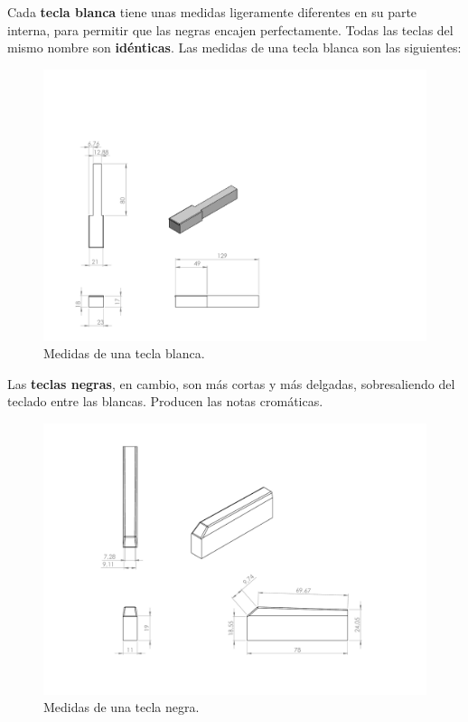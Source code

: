\newpage

Cada \textbf{tecla blanca} tiene unas medidas ligeramente diferentes en su parte interna, para permitir que las negras encajen perfectamente. Todas las teclas del mismo nombre son \textbf{idénticas}. Las medidas de una tecla blanca son las siguientes:

\smallskip

\begin{figure}[H]
	\noindent \begin{centering}
		\includegraphics[width=\linewidth]{capitulo3/blanca_modelo}
		\par\end{centering}
	\smallskip
	\caption{\label{fig:blanca_modelo} Medidas de una tecla blanca.}
\end{figure} 

\newpage

Las \textbf{teclas negras}, en cambio, son más cortas y más delgadas, sobresaliendo del teclado entre las blancas. Producen las notas cromáticas.

\smallskip

\begin{figure}[H]
	\noindent \begin{centering}
		\includegraphics[width=\linewidth*2/3]{capitulo3/negra_modelo}
		\par\end{centering}
	\smallskip
	\caption{\label{fig:negra_modelo} Medidas de una tecla negra.}
\end{figure} 

